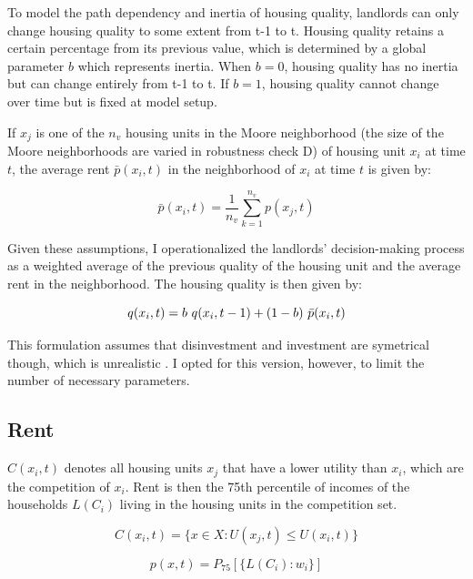 To model the path dependency and inertia of housing quality, landlords can only change housing quality to some extent from t-1 to t. Housing quality retains a certain percentage from its previous value, which is determined by a global parameter $b$ which represents inertia. When $b = 0$, housing quality has no inertia but can change entirely from t-1 to t. If $b = 1$, housing quality cannot change over time but is fixed at model setup.

If $x_j$ is one of the $n_v$ housing units in the Moore neighborhood (the size of the Moore neighborhoods are varied in robustness check D) of housing unit $x_i$ at time $t$, the average rent $\bar{p}(x_i, t)$ in the neighborhood of $x_i$ at time $t$ is given by:

\begin{equation}
\bar{p}(x_i, t) = \frac{1}{n_v} \sum_{k = 1}^{n_v} p(x_j, t)
\end{equation}

Given these assumptions, I operationalized the landlords' decision-making process as a weighted average of the previous quality of the housing unit and the average rent in the neighborhood. The housing quality is then given by:

\begin{equation}
q(x_i, t) = b \ q(x_i, t-1) \\ + \\ (1 - b) \ \bar{p}(x_i, t)
\end{equation}
\label{eq:quality}

This formulation assumes that disinvestment and investment are symetrical though, which is unrealistic \citep{glaeserUrbanDeclineDurable2005}. I opted for this version, however, to limit the number of necessary parameters.

\subsection{Rent}

$C(x_i, t)$ denotes all housing units $x_j$ that have a lower utility than $x_i$, which are the competition of $x_i$. Rent is then the 75th percentile of incomes of the households $L(C_i)$ living in the housing units in the competition set.

\begin{equation}
C(x_i, t) = \{ x \in X: U(x_j, t) \leq U(x_i, t)  \}
\end{equation}

\begin{equation}
p(x, t) = P_{75}[\{ L(C_i): w_i  \}]
\end{equation}


